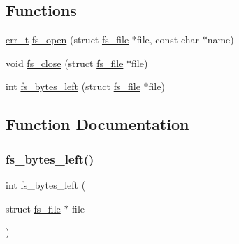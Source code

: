 \subsection*{Functions}
\begin{DoxyCompactItemize}
\item 
\hyperlink{group__infrastructure__errors_gaf02d9da80fd66b4f986d2c53d7231ddb}{err\+\_\+t} \hyperlink{openmote-cc2538_2lwip_2src_2apps_2httpd_2fs_8c_a594058d3f4dd9f333c51b7e5ca910ac3}{fs\+\_\+open} (struct \hyperlink{structfs__file}{fs\+\_\+file} $\ast$file, const char $\ast$name)
\item 
void \hyperlink{openmote-cc2538_2lwip_2src_2apps_2httpd_2fs_8c_a742b1911f18d0c780436b7a6abb08c70}{fs\+\_\+close} (struct \hyperlink{structfs__file}{fs\+\_\+file} $\ast$file)
\item 
int \hyperlink{openmote-cc2538_2lwip_2src_2apps_2httpd_2fs_8c_a3a7ab7c6c0ddd559030d8e91d94ea02b}{fs\+\_\+bytes\+\_\+left} (struct \hyperlink{structfs__file}{fs\+\_\+file} $\ast$file)
\end{DoxyCompactItemize}


\subsection{Function Documentation}
\mbox{\label{openmote-cc2538_2lwip_2src_2apps_2httpd_2fs_8c_a3a7ab7c6c0ddd559030d8e91d94ea02b}} 
\subsubsection{\texorpdfstring{fs\+\_\+bytes\+\_\+left()}{fs\_bytes\_left()}}
{\footnotesize\ttfamily int fs\+\_\+bytes\+\_\+left (\begin{DoxyParamCaption}\item[{struct \hyperlink{structfs__file}{fs\+\_\+file} $\ast$}]{file }\end{DoxyParamCaption})}

\mbox{\label{openmote-cc2538_2lwip_2src_2apps_2httpd_2fs_8c_a742b1911f18d0c780436b7a6abb08c70}} 
